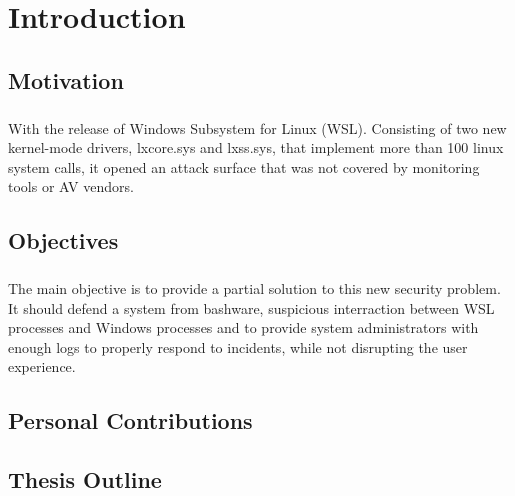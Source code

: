 \chapter{Introduction}
    \section{Motivation}
        \paragraph{} With the release of Windows Subsystem for Linux (WSL). Consisting of two new kernel-mode drivers, lxcore.sys and lxss.sys, that implement
        more than 100 linux system calls, it opened an attack surface that was not covered by monitoring tools or AV vendors.
    \section{Objectives}
        \paragraph{} The main objective is to provide a partial solution to this new security problem. It should defend a system from bashware, suspicious
        interraction between WSL processes and Windows processes and to provide system administrators with enough logs to properly respond to
        incidents, while not disrupting the user experience.
    \section{Personal Contributions}
        \paragraph{}
    \section{Thesis Outline}
        \paragraph{}
